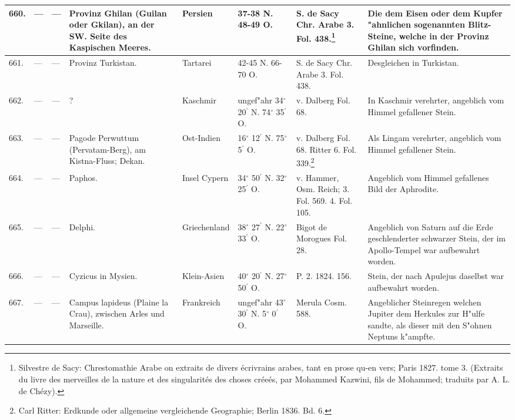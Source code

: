 \documentclass[a4paper, 8pt, oneside, polutonikogreek, german]{article}
\begin{document}
\begin{center}
\begin{longtable}{| p{5mm} | p{3mm} | p{15mm} | p{25mm} | p{20mm} | p{14mm} | p{17mm} | p{24mm} |}
        660. & --- & --- & Provinz Ghilan (Guilan oder Gkilan), an der SW. Seite des Kaspischen Meeres. & Persien & 37-38 N. 48-49 O. & S. de Sacy Chr. Arabe 3. Fol. 438.\footnote{Silvestre de Sacy: Chrestomathie Arabe on extraits de divers écrivrains arabes, tant en prose qu-en vers; Paris 1827. tome 3. (Extraits du livre des merveilles de la nature et des singularités des choses créeés, par Mohammed Kazwini, fils de Mohammed; traduits par A. L. de Chézy).} & Die dem Eisen oder dem Kupfer "ahnlichen sogenannten Blitz-Steine, welche in der Provinz Ghilan sich vorfinden. \\ \hline
        661. & --- & --- & Provinz Turkistan. & Tartarei & 42-45 N. 66-70 O. & S. de Sacy Chr. Arabe 3. Fol. 438. & Desgleichen in Turkistan. \\ \hline
        662. & --- & --- & ? & Kaschmir & ungef"ahr 34$^\circ$ 20$^\prime$ N. 74$^\circ$ 35$^\prime$ O. & v. Dalberg Fol. 68. & In Kaschmir verehrter, angeblich vom Himmel gefallener Stein. \\ \hline
        663. & --- & --- & Pagode Perwuttum (Pervatam-Berg), am Kistna-Fluss; Dekan. & Ost-Indien & 16$^\circ$ 12$^\prime$ N. 75$^\circ$ 5$^\prime$ O. & v. Dalberg Fol. 68. Ritter 6. Fol. 339.\footnote{Carl Ritter: Erdkunde oder allgemeine vergleichende Geographie; Berlin 1836. Bd. 6.} & Als Lingam verehrter, angeblich vom Himmel gefallener Stein. \\ \hline
        664. & --- & --- & Paphos. & Insel Cypern & 34$^\circ$ 50$^\prime$ N. 32$^\circ$ 25$^\prime$ O. & v. Hammer, Osm. Reich; 3. Fol. 569. 4. Fol. 105. & Angeblich vom Himmel gefallenes Bild der Aphrodite. \\ \hline
        665. & --- & --- & Delphi. & Griechenland & 38$^\circ$ 27$^\prime$ N. 22$^\circ$ 33$^\prime$ O. & Bigot de Morogues Fol. 28. & Angeblich von Saturn auf die Erde geschlenderter schwarzer Stein, der im Apollo-Tempel war aufbewahrt worden. \\ \hline
        666. & --- & --- & Cyzicus in Mysien. & Klein-Asien & 40$^\circ$ 20$^\prime$ N. 27$^\circ$ 50$^\prime$ O. & P. 2. 1824. 156. & Stein, der nach Apulejus daselbst war aufbewahrt worden. \\ \hline
        667. & --- & --- & Campus lapideus (Plaine la Crau), zwischen Arles und Marseille. & Frankreich & ungef"ahr 43$^\circ$ 30$^\prime$ N. 5$^\circ$ 0$^\prime$ O. & Merula Cosm. 588. & Angeblicher Steinregen welchen Jupiter dem Herkules zur H"ulfe sandte, als dieser mit den S"ohnen Neptuns k"ampfte. \\ \hline

\end{longtable}
\end{center}
\end{document}
